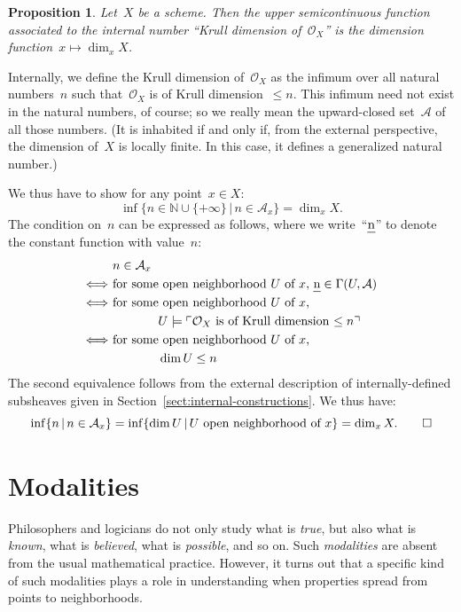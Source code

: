 \documentclass[10pt,reqno,a4paper]{amsbook}
\makeatletter
\theoremstyle{definition}
\theoremstyle{plain}
\newtheorem{prop}[defn]{Proposition}
\theoremstyle{remark}
\newcommand{\A}{\mathcal{A}}
\renewcommand{\O}{\mathcal{O}}
\newcommand{\NN}{\mathbb{N}}
\let\oldul\ul
\renewcommand{\ul}[1]{\text{\oldul{$#1$}}}
\newcommand{\?}{\,{:}\,}
\renewcommand{\_}{\mathpunct{.}\,}
\newcommand{\speak}[1]{\ulcorner\text{\textnormal{#1}}\urcorner}
\renewenvironment{proof}[1][\proofname]{\par
  \pushQED{\qed}%
  \normalfont \topsep6\p@\@plus6\p@\relax
  \trivlist
  \item[\hskip\labelsep
        \itshape
    #1\@addpunct{.}]\ignorespaces
}{%
  \popQED\endtrivlist\@endpefalse
}
\makeatother
\begin{document}
\begin{prop}Let~$X$ be a scheme. Then the upper semicontinuous function
associated to the internal number ``Krull dimension of~$\O_X\!$'' is the
dimension function~$x \mapsto \dim_x X$.\end{prop}
\begin{proof}Internally, we define the Krull dimension of~$\O_X$ as the infimum
over all natural numbers~$n$ such that~$\O_X$ is of Krull
dimension~$\leq n$. This infimum need not exist in the natural numbers, of
course; so we really mean the upward-closed set~$\A$ of all those numbers. (It
is inhabited if and only if, from the external perspective, the dimension
of~$X$ is locally finite. In this case, it defines a generalized natural number.)

We thus have to show for any point~$x \in X$:
\[ \inf\{ n \in \NN \cup \{+\infty\} \,|\, n \in \A_x \} =
  \dim_x X. \]
The condition on~$n$ can be expressed as follows, where we write~``$\ul{n}$''
to denote the constant function with value~$n$:
\begin{align*}
  &\ n \in \A_x \\
  \Longleftrightarrow &\
  \text{for some open neighborhood~$U$ of~$x$, $\ul{n} \in \Gamma(U,\A)$} \\
  \Longleftrightarrow &\
  \text{for some open neighborhood~$U$ of~$x$,} \\
  & \qquad\qquad U \models \speak{$\O_X$ is of Krull dimension~$\leq n$} \\
  \Longleftrightarrow &\
  \text{for some open neighborhood~$U$ of~$x$,} \\
  & \qquad\qquad \dim U \leq n
\end{align*}
The second equivalence follows from the external description of internally-defined
subsheaves given in Section~\ref{sect:internal-constructions}.
We thus have:
\[
  \inf\{ n \,|\, n \in \A_x \} =
    \inf\{ \dim U \,|\, \text{$U$ open neighborhood of~$x$} \}
  = \dim_x X. \qedhere
\]
\end{proof}


\section{Modalities}
\label{sect:modalities}

Philosophers and logicians do not only study what is \emph{true}, but also what
is \emph{known}, what is \emph{believed}, what is \emph{possible}, and so on.
Such \emph{modalities} are absent from the usual mathematical practice.
However, it turns out that a specific kind of such modalities plays a role in
understanding when properties spread from points to neighborhoods.
\end{document}
